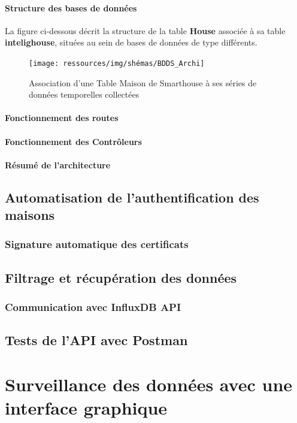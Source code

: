 \documentclass[10pt, a4paper]{report}
\begin{document}
	\paragraph{Structure des bases de données} La figure ci-dessous décrit la structure de la table \textbf{House} associée à sa table \textbf{intelighouse}, situées au sein de bases de données de type différents.
		\begin{figure}[h!]
			\centering
			\texttt{[image: ressources/img/shémas/BDDS\_Archi]}
			\caption{Association d'une Table Maison de Smarthouse à ses séries de données temporelles collectées}
		\label{fig:archBDDs}
		\end{figure}
	\paragraph{Fonctionnement des routes}
	\paragraph{Fonctionnement des Contrôleurs}
	\paragraph{Résumé de l'architecture}
	
	\subsection{Automatisation de l'authentification des maisons}
	\subsubsection{Signature automatique des certificats}
	\subsection{Filtrage et récupération des données}
	\subsubsection{Communication avec InfluxDB API}
	
	\subsection{Tests de l'API avec Postman}
	
	\section{Surveillance des données avec une interface graphique}
\end{document}
